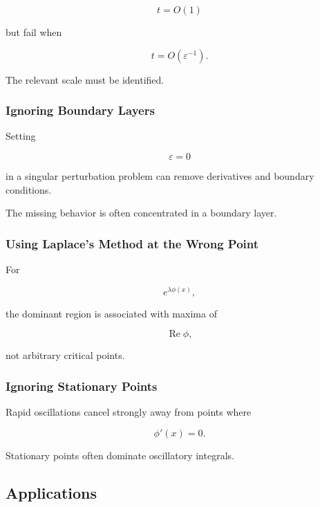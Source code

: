 \[
t=O(1)
\]

but fail when

\[
t=O(\varepsilon^{-1}).
\]

The relevant scale must be identified.

\subsubsection{Ignoring Boundary Layers}

Setting

\[
\varepsilon=0
\]

in a singular perturbation problem can remove derivatives and boundary
conditions.

The missing behavior is often concentrated in a boundary layer.

\subsubsection{Using Laplace's Method at the Wrong Point}

For

\[
e^{\lambda\phi(x)},
\]

the dominant region is associated with maxima of

\[
\operatorname{Re}\phi,
\]

not arbitrary critical points.

\subsubsection{Ignoring Stationary Points}

Rapid oscillations cancel strongly away from points where

\[
\phi'(x)=0.
\]

Stationary points often dominate oscillatory integrals.

\subsection{Applications}
\label{subsec:asymptotic-analysis-applications}

